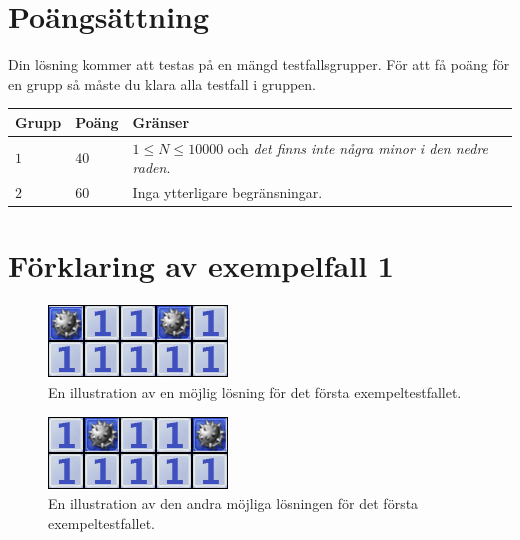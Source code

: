 \section*{Poängsättning}
Din lösning kommer att testas på en mängd testfallsgrupper.
För att få poäng för en grupp så måste du klara alla testfall i gruppen.


\noindent
\begin{tabular}{| l | l | p{12cm} |}
  \hline
  \textbf{Grupp} & \textbf{Poäng} & \textbf{Gränser} \\ \hline
  $1$    & $40$       & $1 \leq N \leq 10000$ och \emph{det finns inte några minor i den nedre raden}. \\ \hline
  $2$    & $60$       & Inga ytterligare begränsningar. \\ \hline
\end{tabular}


\section*{Förklaring av exempelfall 1}

\begin{figure}[h!]
\begin{center}
\includegraphics[scale=1]{miniroj1}
\end{center}
\caption{En illustration av en möjlig lösning för det första exempeltestfallet.}
\label{fig1}
\end{figure}

\begin{figure}[h!]
\begin{center}
\includegraphics[scale=1]{miniroj2}
\end{center}
\caption{En illustration av den andra möjliga lösningen för det första exempeltestfallet.}
\label{fig1}
\end{figure}

